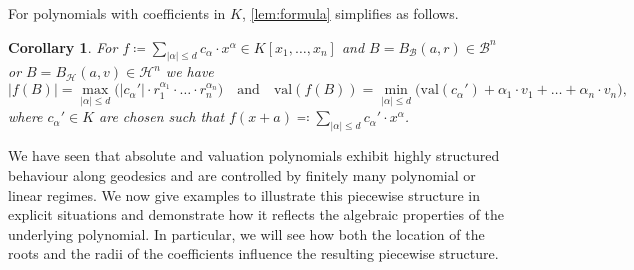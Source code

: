 \documentclass[10pt]{article}
\newtheorem{corollary}[theorem]{Corollary}
\theoremstyle{definition}
\newcommand{\val}{{\mathrm{val}}}
\begin{document}
For polynomials with coefficients in $K$, \cref{lem:formula} simplifies as follows.

\begin{corollary}
  \label{cor:formulaCoefficientsInField}
  For $f\coloneqq \sum_{|\alpha|\leq d} c_\alpha\cdot x^\alpha \in K[x_1, \dotsc, x_n]$ and $B=B_{\mathcal B}(a,r)\in\mathcal B^n$ or $B=B_{\mathcal H}(a,v)\in\mathcal H^n$ we have
  \begin{equation*}
    |f(B)| = \max_{|\alpha|\leq d} \big(|c_\alpha'| \cdot r_1^{\alpha_1}\cdot\ldots\cdot r_n^{\alpha_n}\big) \quad \text{and} \quad \val(f(B)) = \min_{|\alpha|\leq d} \big(\val(c_\alpha') + \alpha_1 \cdot v_1 +\dots+ \alpha_n\cdot v_n\big),
  \end{equation*}
  where $c_\alpha'\in K$ are chosen such that $f(x+a)\eqqcolon\sum_{|\alpha|\leq d} c_\alpha'\cdot x^\alpha$.
\end{corollary}

We have seen that absolute and valuation polynomials exhibit highly structured behaviour along geodesics and are controlled by finitely many polynomial or linear regimes. We now give examples to illustrate this piecewise structure in explicit situations and demonstrate how it reflects the algebraic properties of the underlying polynomial. In particular, we will see how both the location of the roots and the radii of the coefficients influence the resulting piecewise structure.
\end{document}
